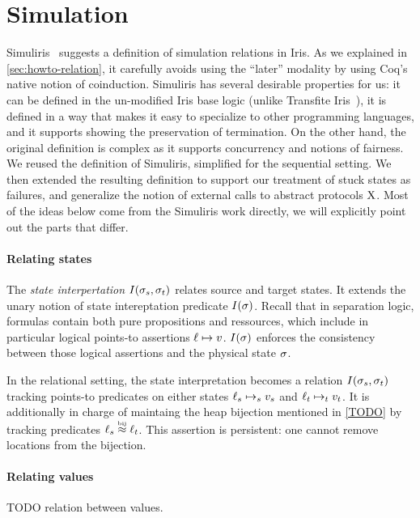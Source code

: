\section{Simulation}

Simuliris~\citep*{TODO-simuliris} suggests a definition of simulation relations in Iris. As we explained in \cref{sec:howto-relation}, it carefully avoids using the ``later'' modality by using Coq's native notion of coinduction. Simuliris has several desirable properties for us: it can be defined in the un-modified Iris base logic (unlike Transfite Iris~\citep*{transfinite-iris}), it is defined in a way that makes it easy to specialize to other programming languages, and it supports showing the preservation of termination. On the other hand, the original definition is complex as it supports concurrency and notions of fairness. We reused the definition of Simuliris, simplified for the sequential setting. We then extended the resulting definition to support our treatment of stuck states as failures, and generalize the notion of external calls to abstract protocols $\mathrm{X}$. Most of the ideas below come from the Simuliris work directly, we will explicitly point out the parts that differ.

\paragraph{Relating states} The \emph{state interpertation} $I(\datalangState_s, \datalangState_t)$ relates source and target states. It extends the unary notion of state intereptation predicate $I(\datalangState)$. Recall that in separation logic, formulas contain both pure propositions and ressources, which include in particular logical points-to assertions $\datalangLoc \iPointsto v$. $I(\datalangState)$ enforces the consistency between those logical assertions and the physical state $\datalangState$.

In the relational setting, the state interpretation becomes a relation $I(\datalangState_s, \datalangState_t)$ tracking points-to predicates on either states $\datalangLoc_s \iPointsto_s \datalangVal_s$ and $\datalangLoc_t \iPointsto_t \datalangVal_t$. It is additionally in charge of maintaing the heap bijection mentioned in \cref{TODO} by tracking predicates $\datalangLoc_s \iInBij \datalangLoc_t$. This assertion is persistent: one cannot remove locations from the bijection.

\paragraph{Relating values} TODO relation between values.

